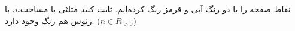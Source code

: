 \EXERCISE
نقاط صفحه را با دو رنگ آبی و قرمز رنگ کرده‌ایم. ثابت کنید مثلثی با مساحت$n$، با رئوس هم رنگ وجود دارد.
($n \in R_{>0}$)